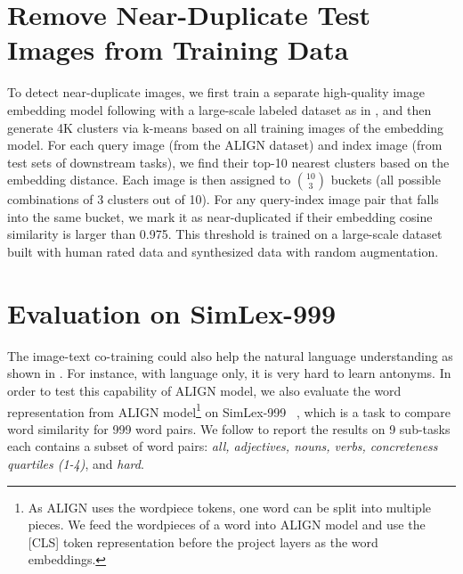 \documentclass{article}
\begin{document}








\clearpage
\newpage

\appendix

\section{Remove Near-Duplicate Test Images from Training Data} \label{sec:near-dup}
To detect near-duplicate images, we first train a separate high-quality image embedding model following \cite{wang:sbv3} with a large-scale labeled dataset as in \cite{juan:graphrise}, and then generate 4K clusters via k-means based on all training images of the embedding model. For each query image (from the ALIGN dataset) and index image (from test sets of downstream tasks), we find their top-10 nearest clusters based on the embedding distance. Each image is then assigned to $10 \choose 3$ buckets (all possible combinations of 3 clusters out of 10). For any query-index image pair that falls into the same bucket, we mark it as near-duplicated if their embedding cosine similarity is larger than 0.975. This threshold is trained on a large-scale dataset built with human rated data and synthesized data with random augmentation.

\section{Evaluation on SimLex-999}

The image-text co-training could also help the natural language understanding as shown in \citet{kiros:picturebook}. 
For instance, with language only, it is very hard to learn antonyms.
In order to test this capability of ALIGN model, we also evaluate the word representation from ALIGN model\footnote{As ALIGN uses the wordpiece tokens, one word can be split into multiple pieces. We feed the wordpieces of a word into ALIGN model and use the [CLS] token representation before the project layers as the word embeddings.} on SimLex-999 ~\cite{simlex-999}, which is a task to compare word similarity for 999 word pairs.
We follow \citet{kiros:picturebook} to report the results on 9 sub-tasks each contains a subset of word pairs: \textit{all, adjectives, nouns, verbs, concreteness quartiles (1-4)}, and \textit{hard}.
\end{document}

